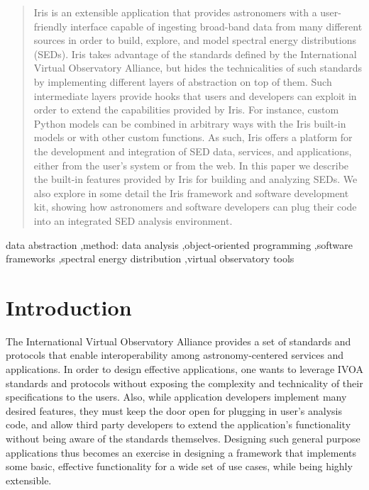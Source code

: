\documentclass[preprint,authoryear,5p]{elsarticle}
\begin{document}
\begin{frontmatter}
\begin{abstract}
Iris is an extensible application that provides astronomers with a user-friendly
interface capable of ingesting broad-band data from many different sources
in order to build, explore, and model spectral energy distributions (SEDs). Iris
takes advantage of the standards defined by the International Virtual
Observatory Alliance, but hides the technicalities of such standards by
implementing different layers of abstraction on top of them. Such intermediate
layers provide hooks that users and developers can exploit in order to extend
the capabilities provided by Iris. For instance, custom Python models can be
combined in arbitrary ways with the Iris built-in models or with other custom
functions. As such, Iris offers a platform for the development and integration
of SED data, services, and applications, either from the user's system or from
the web. In this paper we describe the built-in features provided by Iris for
building and analyzing SEDs. We also explore in some detail the Iris framework
and software development kit, showing how astronomers and software developers
can plug their code into an integrated SED analysis environment.  \end{abstract}




\begin{keyword}
data abstraction \sep method: data analysis \sep object-oriented programming \sep software frameworks \sep spectral energy distribution \sep virtual observatory tools
\end{keyword}

\end{frontmatter}




\label{sec:introduction} \section{Introduction} 
\begin{sloppypar}
The International Virtual
Observatory Alliance \citep[IVOA;][]{2004SPIE.5493..137Q} provides a set of
standards and protocols that enable interoperability among astronomy-center\-ed
services and applications. In order to design effective applications, one wants
to leverage IVOA standards and protocols without exposing the complexity and
technicality of their specifications to the users. Also, while application
developers implement many desired features, they must keep the door open
for plugging in user's analysis code, and allow third party developers to extend
the application's functionality without being aware of the standards themselves.
Designing such general purpose applications thus becomes an exercise in
designing a framework that implements some basic, effective functionality for a
wide set of use cases, while being highly extensible.
\end{sloppypar}
\end{document}
